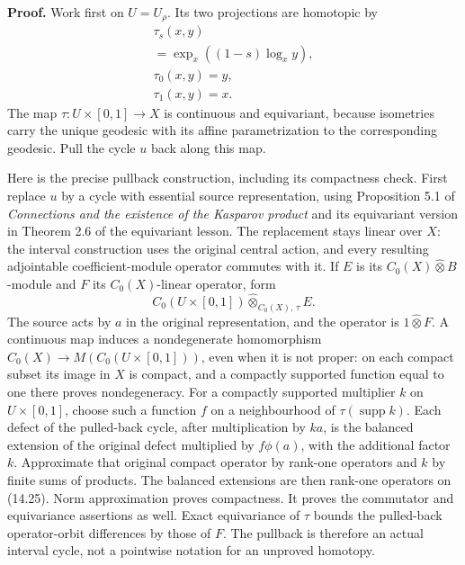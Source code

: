 \documentclass[
  11pt,
]{article}
\begin{document}
\textbf{Proof.} Work first on \(U=U_\rho\). Its two projections are
homotopic by \[
\begin{gathered}
\tau_s(x,y)\\
=\exp_x((1-s)\log_xy),\\
\tau_0(x,y)=y,\\
\tau_1(x,y)=x.
\end{gathered}
\tag{14.24}
\] The map \(\tau:U\times[0,1]\to X\) is continuous and equivariant,
because isometries carry the unique geodesic with its affine
parametrization to the corresponding geodesic. Pull the cycle \(u\) back
along this map.

Here is the precise pullback construction, including its compactness
check. First replace \(u\) by a cycle with essential source
representation, using Proposition 5.1 of \emph{Connections and the
existence of the Kasparov product} and its equivariant version in
Theorem 2.6 of the equivariant lesson. The replacement stays linear over
\(X\): the interval construction uses the original central action, and
every resulting adjointable coefficient-module operator commutes with
it. If \(E\) is its \(C_0(X)\widehat\otimes B\)-module and \(F\) its
\(C_0(X)\)-linear operator, form \[
C_0(U\times[0,1])
 \widehat\otimes_{C_0(X),\,\tau} E.
\tag{14.25}
\] The source acts by \(a\) in the original representation, and the
operator is \(1\widehat\otimes F\). A continuous map induces a
nondegenerate homomorphism \(C_0(X)\to M(C_0(U\times[0,1]))\), even when
it is not proper: on each compact subset its image in \(X\) is compact,
and a compactly supported function equal to one there proves
nondegeneracy. For a compactly supported multiplier \(k\) on
\(U\times[0,1]\), choose such a function \(f\) on a neighbourhood of
\(\tau(\operatorname{supp}k)\). Each defect of the pulled-back cycle,
after multiplication by \(ka\), is the balanced extension of the
original defect multiplied by \(f\phi(a)\), with the additional factor
\(k\). Approximate that original compact operator by rank-one operators
and \(k\) by finite sums of products. The balanced extensions are then
rank-one operators on (14.25). Norm approximation proves compactness. It
proves the commutator and equivariance assertions as well. Exact
equivariance of \(\tau\) bounds the pulled-back operator-orbit
differences by those of \(F\). The pullback is therefore an actual
interval cycle, not a pointwise notation for an unproved homotopy.
\end{document}
